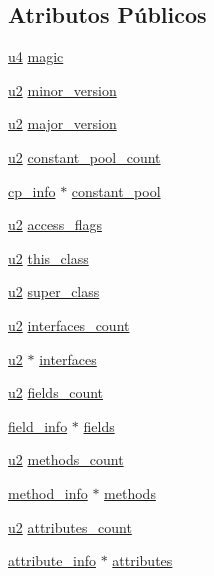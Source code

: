 \subsection*{Atributos Públicos}
\begin{DoxyCompactItemize}
\item 
\hyperlink{ClassLoader_8h_aedf6ddc03df8caaaccbb4c60b9a9b850}{u4} \hyperlink{structClassFile_a09085e9db513dae2f46da6e0a26c1b59}{magic}
\item 
\hyperlink{ClassLoader_8h_a5f223212eef04d10a4550ded680cb1cf}{u2} \hyperlink{structClassFile_af0db7b0ea01cb9cea2cee177ca81df09}{minor\+\_\+version}
\item 
\hyperlink{ClassLoader_8h_a5f223212eef04d10a4550ded680cb1cf}{u2} \hyperlink{structClassFile_abede9cb937e65072517d0ee6e26e2757}{major\+\_\+version}
\item 
\hyperlink{ClassLoader_8h_a5f223212eef04d10a4550ded680cb1cf}{u2} \hyperlink{structClassFile_ac8fdf5cccfd632da4fdb21ae63fffa7a}{constant\+\_\+pool\+\_\+count}
\item 
\hyperlink{structcp__info}{cp\+\_\+info} $\ast$ \hyperlink{structClassFile_a2309d843091aad79aed04ce92470a434}{constant\+\_\+pool}
\item 
\hyperlink{ClassLoader_8h_a5f223212eef04d10a4550ded680cb1cf}{u2} \hyperlink{structClassFile_ae88db578147f7ee0d6fc1aeacb341854}{access\+\_\+flags}
\item 
\hyperlink{ClassLoader_8h_a5f223212eef04d10a4550ded680cb1cf}{u2} \hyperlink{structClassFile_a2d33db0a560a71b94bc572dd1e4ec03a}{this\+\_\+class}
\item 
\hyperlink{ClassLoader_8h_a5f223212eef04d10a4550ded680cb1cf}{u2} \hyperlink{structClassFile_a5f6c11c0ccb02fd992b5c102725253ec}{super\+\_\+class}
\item 
\hyperlink{ClassLoader_8h_a5f223212eef04d10a4550ded680cb1cf}{u2} \hyperlink{structClassFile_a337fcb7da33d1b64631441115c7de305}{interfaces\+\_\+count}
\item 
\hyperlink{ClassLoader_8h_a5f223212eef04d10a4550ded680cb1cf}{u2} $\ast$ \hyperlink{structClassFile_af599de97e062c98966470f1590496425}{interfaces}
\item 
\hyperlink{ClassLoader_8h_a5f223212eef04d10a4550ded680cb1cf}{u2} \hyperlink{structClassFile_acea207ee523fbc16611d3cf436c390e0}{fields\+\_\+count}
\item 
\hyperlink{structfield__info}{field\+\_\+info} $\ast$ \hyperlink{structClassFile_aa324f88c75aa96c632f8c57d010aab0c}{fields}
\item 
\hyperlink{ClassLoader_8h_a5f223212eef04d10a4550ded680cb1cf}{u2} \hyperlink{structClassFile_aacfb45d4af64216324b1ae5269c870d5}{methods\+\_\+count}
\item 
\hyperlink{structmethod__info}{method\+\_\+info} $\ast$ \hyperlink{structClassFile_ad061f06cd709d10dbfbf82f443e43632}{methods}
\item 
\hyperlink{ClassLoader_8h_a5f223212eef04d10a4550ded680cb1cf}{u2} \hyperlink{structClassFile_a633c696fbe08e7e7906b2ab1e52f3d1b}{attributes\+\_\+count}
\item 
\hyperlink{structattribute__info}{attribute\+\_\+info} $\ast$ \hyperlink{structClassFile_a8bf809db8e1008f401dc3cda5e9cdb14}{attributes}
\end{DoxyCompactItemize}



